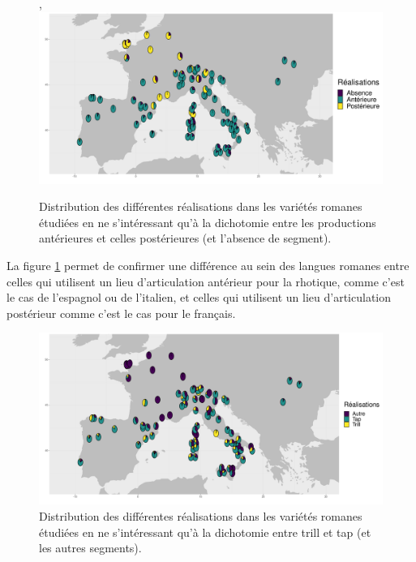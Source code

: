\begin{figure}
	\centering,
	\includegraphics[width=1\linewidth]{substance/images/productionromane_2_viridis}
	\caption[Distribution des différentes réalisations dans les variétés romanes pour les productions antérieures et postérieures]{Distribution des différentes réalisations dans les variétés romanes étudiées en ne s'intéressant qu'à la dichotomie entre les productions antérieures et celles postérieures (et l'absence de segment).}
	\label{fig:productionromane2viridis}
\end{figure}

La figure \ref{fig:productionromane2viridis} permet de confirmer une différence au sein des langues romanes entre celles qui utilisent un lieu d'articulation antérieur pour la rhotique, comme c'est le cas de l'espagnol ou de l'italien, et celles qui utilisent un lieu d'articulation postérieur comme c'est le cas pour le français.\\

\begin{figure}
	\centering
	\includegraphics[width=1\linewidth]{substance/images/productionromane_3_viridis}
	\caption[Distribution des différentes réalisations dans les variétés romanes pour le trill et le tap]{Distribution des différentes réalisations dans les variétés romanes étudiées en ne s'intéressant qu'à la dichotomie entre trill et tap (et les autres segments).}
	\label{fig:productionromane3viridis}
\end{figure}

